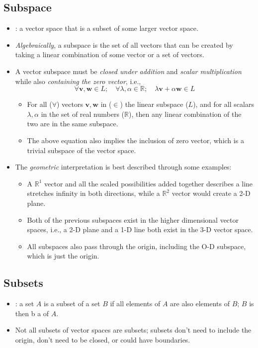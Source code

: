 \begin{itemize}
  \subsection{Subspace}\label{Subspace}
  \begin{itemize}
    \item {}: a vector space that is a subset of some larger vector space.
    \item \emph{Algebraically}, a subspace is the set of all vectors that can be created by taking a linear combination of some vector or a set of vectors.
    \item A vector subspace must be \emph{closed under} \emph{addition} and \emph{scalar multiplication} while also \emph{containing the zero vector}, i.e.,
    \[%
    \forall\bm{v}, \bm{w} \in L;\quad \forall\lambda,\alpha \in \mathbb{R};\quad \lambda \bm{v} + \alpha \bm{w} \in L
    \]%
    \begin{itemize}
      \item For all (\(\forall \)) vectors \(\bm{v},\bm{w}\) in (\(\in \)) the linear subspace (\(L\)), and for all scalars \(\lambda,\alpha \) in the set of real numbers (\(\mathbb{R}\)), then any linear combination of the two are in the same subspace.
      \item The above equation also implies the inclusion of zero vector, which is a trivial subspace of the vector space.
    \end{itemize}
    \item The \emph{geometric} interpretation is best described through some examples:
    \begin{itemize}
      \item A \(\mathbb{R}^1\) vector and all the scaled possibilities added together describes a line stretches infinity in both directions, while a \(\mathbb{R}^2\) vector would create a 2-D plane. 
      \item Both of the previous subspaces exist in the higher dimensional vector spaces, i.e., a 2-D plane and a 1-D line both exist in the 3-D vector space.
      \item All subspaces also pass through the origin, including the O-D subspace, which is just the origin.
    \end{itemize}
  \end{itemize}

  \subsection{Subsets}\label{Subsets}
  \begin{itemize}
    \item {}: a set \(A\) is a subset of a set \(B\) if all elements of \(A\) are also elements of \(B\); \(B\) is then b a  of \(A\).
    \item Not all subsets of vector spaces are subsets; subsets don't need to include the origin, don't need to be closed, or could have boundaries.
  \end{itemize}
  

\end{itemize}
